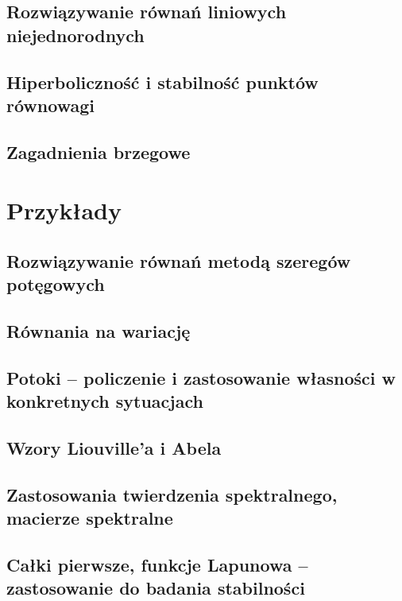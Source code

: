 \documentclass{mwart}
\begin{document}
    \subsection{Rozwiązywanie równań liniowych niejednorodnych}
    \subsection{Hiperboliczność i stabilność punktów równowagi}
    \subsection{Zagadnienia brzegowe}
  
  \section{Przykłady}
    \subsection{Rozwiązywanie równań metodą szeregów potęgowych}
    \subsection{Równania na wariację}
    \subsection{Potoki -- policzenie i zastosowanie własności w konkretnych sytuacjach}
    \subsection{Wzory Liouville'a i Abela}
    \subsection{Zastosowania twierdzenia spektralnego, macierze spektralne}
    \subsection{Całki pierwsze, funkcje Lapunowa -- zastosowanie do badania stabilności}
\end{document}
